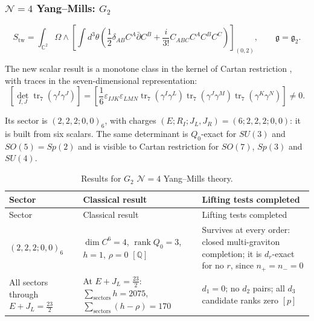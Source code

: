 \documentclass[11pt]{article}
\numberwithin{equation}{section}
\numberwithin{figure}{section}
\numberwithin{table}{section}
\begin{document}
\subsubsection{$\mathcal N=4$ Yang--Mills: $G_2$}\label{sec-results-G2}

\begin{equation}\label{local-ch9-g2-action}
S_{\mathrm{tw}}=\int_{\mathbb C^2}\Omega\wedge
\left[\int d^3\theta\left(\frac12\delta_{AB}C^A\bar\partial C^B
+\frac{i}{3!}C_{ABC}C^AC^BC^C\right)\right]_{(0,2)},
\qquad\mathfrak g=\mathfrak g_2.
\end{equation}

The new scalar result is a monotone class in the kernel of Cartan restriction \cite[supplement, Section S5.2]{Repo}, with traces in the seven-dimensional representation:
\begin{equation}\label{local-ch9-g2-gram-class}
\left[\det_{I,J}\operatorname{tr}_7(\gamma^I\gamma^J)\right]
=\left[\frac16\varepsilon_{IJK}\varepsilon_{LMN}
\operatorname{tr}_7(\gamma^I\gamma^L)
\operatorname{tr}_7(\gamma^J\gamma^M)
\operatorname{tr}_7(\gamma^K\gamma^N)\right]\ne0.
\end{equation}

Its sector is $(2,2,2;0,0)_6$, with charges $(E;R_I;J_L,J_R)=(6;2,2,2;0,0)$: it is built from six scalars. The same determinant is $Q_0$-exact for $SU(3)$ and $SO(5)=Sp(2)$ and is visible to Cartan restriction for $SO(7)$, $Sp(3)$ and $SU(4)$.

{\footnotesize\renewcommand{\arraystretch}{1.3}\setlength{\tabcolsep}{3.5pt}
\begin{xltabular}{\linewidth}{|>{\raggedright\arraybackslash}p{3.3cm}|>{\raggedright\arraybackslash}X|>{\raggedright\arraybackslash}X|}
\caption{Results for $G_2$ $\mathcal N=4$ Yang--Mills theory.}\label{local-ch9-g2-results}\\
\hline
Sector & Classical result & Lifting tests completed\\
\hline\endfirsthead
\hline
Sector & Classical result & Lifting tests completed\\
\hline\endhead
$(2,2,2;0,0)_6$ & $\dim C^6=4$, $\operatorname{rank}Q_0=3$, $h=1$, $\rho=0$ $[\mathbb Q]$ & Survives at every order: closed multi-graviton completion; it is $d_r$-exact for no $r$, since $n_+=n_-=0$\\
\hline
All sectors through $E+J_L=\tfrac{23}2$ & At $E+J_L=\tfrac{23}2$: $\sum_{\text{sectors}}h=2075$, $\sum_{\text{sectors}}(h-\rho)=170$ & $d_1=0$; no $d_2$ pairs; all $d_3$ candidate ranks zero $[p]$\\
\hline
\end{xltabular}}
\end{document}
